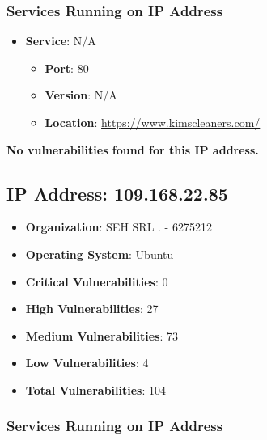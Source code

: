 \documentclass{article}
\begin{document}
\subsubsection*{Services Running on IP Address}

\begin{itemize}
    
        \item \textbf{Service}: N/A
        \begin{itemize}
            \item \textbf{Port}: 80
            \item \textbf{Version}:  N/A 
            \item \textbf{Location}: \href{ https://www.kimscleaners.com/ }{ https://www.kimscleaners.com/ }
        \end{itemize}
    
\end{itemize}


\textbf{No vulnerabilities found for this IP address.}




\clearpage



\subsection*{IP Address: 109.168.22.85}

\begin{itemize}
    \item \textbf{Organization}: SEH SRL . - 6275212
    \item \textbf{Operating System}:  Ubuntu 
    \item \textbf{Critical Vulnerabilities}: 0
    \item \textbf{High Vulnerabilities}: 27
    \item \textbf{Medium Vulnerabilities}: 73
    \item \textbf{Low Vulnerabilities}: 4
    \item \textbf{Total Vulnerabilities}: 104
\end{itemize}

\subsubsection*{Services Running on IP Address}
\end{document}
